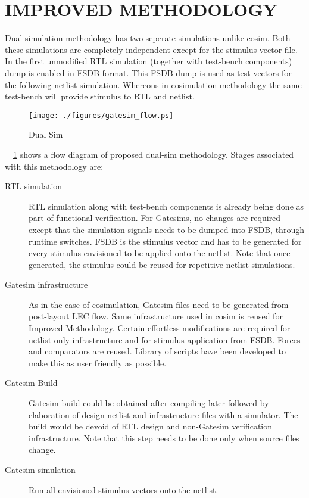 \section {IMPROVED METHODOLOGY}
\label{sec:dualsim:im}
Dual simulation methodology has two seperate simulations unlike cosim. Both these simulations are completely independent except for the stimulus vector file. In the first unmodified RTL simulation (together with test-bench components) dump is enabled in FSDB format. This FSDB dump is used as test-vectors for the following netlist simulation. Whereous in cosimulation methodology the same test-bench will provide stimulus to RTL and netlist.
\begin{figure}[h]
\centering
\texttt{[image: ./figures/gatesim\_flow.ps]}
\caption{Dual Sim}
\label{fig:gatesim_flow.ps}
\end{figure}

 ~\figurename{~\ref{fig:gatesim_flow.ps}} shows a flow diagram of proposed dual-sim methodology. Stages associated with this methodology are:
\begin{description}
	\item[RTL simulation] RTL simulation along with test-bench components is already being done as part of functional verification. For Gatesims, no changes are required except that the simulation signals needs to be dumped into FSDB, through runtime switches. FSDB is the stimulus vector and has to be generated for every stimulus envisioned to be applied onto the netlist. Note that once generated, the stimulus could be reused for repetitive netlist simulations.
	\item[Gatesim infrastructure] As in the case of cosimulation, Gatesim files need to be generated from post-layout LEC flow. Same infrastructure used in cosim is reused for Improved Methodology. Certain effortless modifications are required for netlist only infrastructure and for stimulus application from FSDB. Forces and comparators are reused. Library of scripts have been developed to make this as user friendly as possible.
	\item[Gatesim Build] Gatesim build could be obtained after compiling later followed by elaboration of design netlist and infrastructure files with a simulator. The build would be devoid of RTL design and non-Gatesim verification infrastructure. Note that this step needs to be done only when source files change.
	\item[Gatesim simulation] Run all envisioned stimulus vectors onto the netlist.
\end{description}


